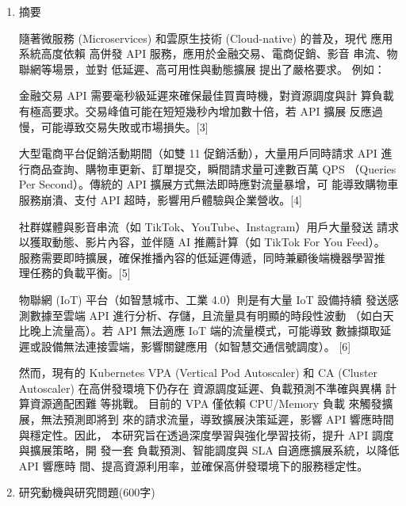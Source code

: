 \documentclass[12pt,a4paper]{article}
\begin{document}
\setlength{\parindent}{2em}


\begin{enumerate}[label={(\zhdig*)}, leftmargin=2\parindent, listparindent=\parindent]

\item 摘要

    隨著微服務 (Microservices) 和雲原生技術 (Cloud-native) 的普及，現代
    應用系統高度依賴 高併發 API 服務，應用於金融交易、電商促銷、影音
    串流、物聯網等場景，並對 低延遲、高可用性與動態擴展 提出了嚴格要求。
    例如：

    金融交易 API 需要毫秒級延遲來確保最佳買賣時機，對資源調度與計
    算負載有極高要求。交易峰值可能在短短幾秒內增加數十倍，若 API 擴展
    反應過慢，可能導致交易失敗或市場損失。[3]

    大型電商平台促銷活動期間（如雙 11 促銷活動），大量用戶同時請求
    API 進行商品查詢、購物車更新、訂單提交，瞬間請求量可達數百萬 QPS
    （Queries Per Second）。傳統的 API 擴展方式無法即時應對流量暴增，可
    能導致購物車服務崩潰、支付 API 超時，影響用戶體驗與企業營收。[4]

    社群媒體與影音串流（如 TikTok、YouTube、Instagram）用戶大量發送
    請求以獲取動態、影片內容，並伴隨 AI 推薦計算（如 TikTok For You Feed）。
    服務需要即時擴展，確保推播內容的低延遲傳遞，同時兼顧後端機器學習推
    理任務的負載平衡。[5]

    物聯網 (IoT) 平台（如智慧城市、工業 4.0）則是有大量 IoT 設備持續
    發送感測數據至雲端 API 進行分析、存儲，且流量具有明顯的時段性波動
    （如白天比晚上流量高）。若 API 無法適應 IoT 端的流量模式，可能導致
    數據擷取延遲或設備無法連接雲端，影響關鍵應用（如智慧交通信號調度）。
    [6]

    然而，現有的 Kubernetes VPA (Vertical Pod Autoscaler) 和 CA (Cluster
    Autoscaler) 在高併發環境下仍存在 資源調度延遲、負載預測不準確與異構
    計算資源適配困難 等挑戰。
    目前的 VPA 僅依賴 CPU/Memory 負載 來觸發擴展，無法預測即將到
    來的請求流量，導致擴展決策延遲，影響 API 響應時間與穩定性。因此，
    本研究旨在透過深度學習與強化學習技術，提升 API 調度與擴展策略，開
    發一套 負載預測、智能調度與 SLA 自適應擴展系統，以降低 API 響應時
    間、提高資源利用率，並確保高併發環境下的服務穩定性。

\item 研究動機與研究問題(600字)\label{研究動機}

\begin{enumerate}[label={(\arabic*)}, leftmargin=\parindent, listparindent=\parindent]


\end{enumerate}
\end{enumerate}
\end{document}
